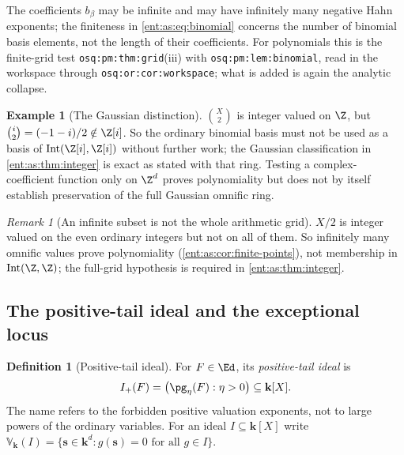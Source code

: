 \documentclass[11pt]{article}
\theoremstyle{plain}
\theoremstyle{plain}
\theoremstyle{plain}
\theoremstyle{definition}
\newtheorem{definition}[definition]{Definition}
\theoremstyle{definition}
\theoremstyle{definition}
\newtheorem{example}[example]{Example}
\theoremstyle{definition}
\theoremstyle{remark}
\newtheorem{remark}[remark]{Remark}
\newcommand{\kk}{\mathbf k}\newcommand{\PP}{\mathbb P}
\DeclareMathOperator{\Int}{Int}\DeclareMathOperator{\ct}{ct}
\begin{document}
The coefficients $b_\beta$ may be infinite and may have infinitely many
negative Hahn exponents; the finiteness in \eqref{ent:as:eq:binomial} concerns
the number of binomial basis elements, not the length of their coefficients.
For polynomials this is the finite-grid test \texttt{osq:pm:thm:grid}(iii) with
\texttt{osq:pm:lem:binomial}, read in the workspace through
\texttt{osq:or:cor:workspace}; what is added is again the analytic collapse.

\begin{example}[The Gaussian distinction]\label{ent:as:ex:gaussian}
$\binom X2$ is integer valued on $\Z$, but $\binom i2=(-1-i)/2\notin\Z[i]$. So
the ordinary binomial basis must not be used as a basis of
$\Int(\Z[i],\Z[i])$ without further work; the Gaussian classification in
\cref{ent:as:thm:integer} is exact as stated with that ring. Testing a
complex-coefficient function only on $\Z^d$ proves polynomiality but does not
by itself establish preservation of the full Gaussian omnific ring.
\end{example}

\begin{remark}[An infinite subset is not the whole arithmetic grid]
\label{ent:as:rem:subset}
$X/2$ is integer valued on the even ordinary integers but not on all of them.
So infinitely many omnific values prove polynomiality
(\cref{ent:as:cor:finite-points}), not membership in $\Int(\Z,\Z)$; the
full-grid hypothesis is required in \cref{ent:as:thm:integer}.
\end{remark}

\subsection{The positive-tail ideal and the exceptional locus}
\label{ent:as:subsec:tail}

\begin{definition}[Positive-tail ideal]\label{ent:as:def:tail}
For $F\in\Ed$, its \emph{positive-tail ideal} is
\begin{equation}\label{ent:as:eq:tail-ideal}
 I_+(F)=\bigl(\pg_\eta(F):\eta>0\bigr)\subseteq\kk[X].
\end{equation}
The name refers to the forbidden positive valuation exponents, not to large
powers of the ordinary variables. For an ideal $I\subseteq\kk[X]$ write
$\mathbb V_\kk(I)=\{\mathbf s\in\kk^d:g(\mathbf s)=0\text{ for all }g\in I\}$.
\end{definition}
\end{document}
